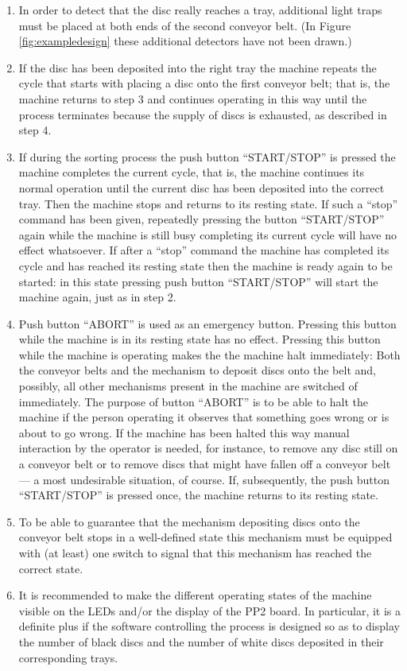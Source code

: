 \documentclass[a4paper,oneside,11pt]{report}
\begin{document}
\begin{enumerate}
\item In order to detect that the disc really reaches a tray, additional light traps must be placed at both ends of the second conveyor belt. (In Figure \ref{fig:exampledesign} these additional detectors have not been drawn.)
\item If the disc has been deposited into the right tray the machine repeats the cycle that starts with placing a disc onto the first conveyor belt; that is, the machine returns to step 3 and continues operating in this way until the process terminates because the supply of discs is exhausted, as described in step 4.
\item If during the sorting process the push button “START/STOP” is pressed the machine completes the current cycle, that is, the machine continues its normal operation until the current disc has been deposited into the correct tray. Then the machine stops and returns to its resting state. If such a “stop” command has been given, repeatedly pressing the button “START/STOP” again while the machine is still busy completing its current cycle will have no effect whatsoever. If after a “stop” command the machine has completed its cycle and has reached its resting state then the machine is ready again to be started: in this state pressing push button “START/STOP” will start the machine again, just as in step 2.
\item Push button “ABORT” is used as an emergency button. Pressing this button while the machine is in its resting state has no effect. Pressing this button while the machine is operating makes the the machine halt immediately: Both the conveyor belts and the mechanism to deposit discs onto the belt and, possibly, all other mechanisms present in the machine are switched of immediately. The purpose of button “ABORT” is to be able to halt the machine if the person operating it observes that something goes wrong or is about to go wrong. If the machine has been halted this way manual interaction by the operator is needed, for instance, to remove any disc still on a conveyor belt or to remove discs that might have fallen off a conveyor belt --- a most undesirable situation, of course. If, subsequently, the push button “START/STOP” is pressed once, the machine returns to its resting state.
\item To be able to guarantee that the mechanism depositing discs onto the conveyor belt stops in a well-defined state this mechanism must be equipped with (at least) one switch to signal that this mechanism has reached the correct state.
\item It is recommended to make the different operating states of the machine visible on the LEDs and/or the display of the PP2 board. In particular, it is a definite plus if the software controlling the process is designed so as to display the number of black discs and the number of white discs deposited in their corresponding trays.
\end{enumerate}
\end{document}
